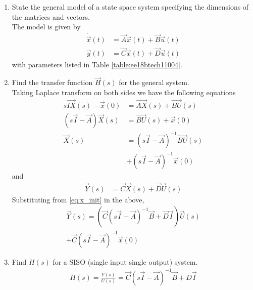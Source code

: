 \begin{enumerate}[label=\thesection.\arabic*.,ref=\thesection.\theenumi]
\item State the general model of a state space system specifying the dimensions of the matrices and vectors.
\\
\solution The model is given by 
\begin{align}
\dot{\vec{x}}(t)&=\vec{A}\vec{x}(t)+\vec{B}\vec{u}(t) \\
 \vec{y}(t)&=\vec{C}\vec{x}(t)+\vec{D} \vec{u}(t)
\label{eq:ee18btech11004_state}
\end{align}
with parameters listed in Table \ref{table:ee18btech11004}.
%
\begin{table}[!ht]
\centering

\caption{}
\label{table:ee18btech11004}
\end{table}

\item Find the transfer function $\vec{H}(s)$ for the general system.
\\
\solution 
Taking Laplace transform on both sides we have the following equations
\begin{align}
 s\vec{IX}(s)-\vec{x}(0)&= \vec{AX}(s)+ \vec{BU}(s)\\
(s\vec{I}-\vec{A})\vec{X}(s)&= \vec{BU}(s)+ \vec{x}(0)\\
\vec{X}(s)&={(s\vec{I}-\vec{A})^{-1}}\vec{B U}(s)\\
& +(s\vec{I}-\vec{A})^{-1}\vec{x}(0)
\label{eq:ee18btech11006_x_init}
\end{align}
and
\begin{align}
\vec{Y}(s)&= \vec{C}\vec{X}(s)+\vec{D}\vec{U}(s)
\end{align}
Substituting from \eqref{eq:x_init} in the above,
%
\begin{multline}
\vec{Y}(s)=( \vec{C}{(s\vec{I}-\vec{A})^{-1}}\vec{B}+\vec{D}\vec{I}) \vec{U}(s) 
\\
+ \vec{C}(s\vec{I}-\vec{A})^{-1}\vec{x}(0)
\label{eq:ee18btech11006_yx_init}
\end{multline}
%
\item Find $H(s)$ for a SISO (single input single output) system.
\\
\solution
\begin{align}
\label{eq:ee18btech11004_siso}
H(s)= {\frac{Y(s)}{U(s)}}= \vec{C}{(s\vec{I}-\vec{A})^{-1}}\vec{B}+D\vec{I}
\end{align}


\end{enumerate}

